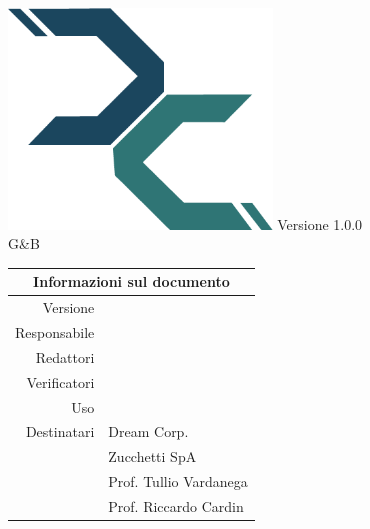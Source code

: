 \maketitle
	\begin{center}
	\hspace{5em}
	   \includegraphics[width =70mm]{logo.png}\newline
	\huge Versione 1.0.0 
	\\G\&B
	\begin{table}[!htpb]
		\centering
		\begin{tabular}{r|l}
			\multicolumn{2}{c}{Informazioni sul documento}\\
			\hline
			Versione & \version \\
			Responsabile & \res\\
			Redattori & \red \\
			Verificatori & \verp\\
			Uso & \use\\

			Destinatari & Dream Corp. \\
			& Zucchetti SpA\\
			& Prof. Tullio Vardanega\\
			& Prof. Riccardo Cardin\\
		\end{tabular}
	\end{table}
	\end{center}
	\newpage
	~
	
	\clearpage
	\newpage
	\tableofcontents
	\newpage
	\listoftables
	\listoffigures
	\newpage
